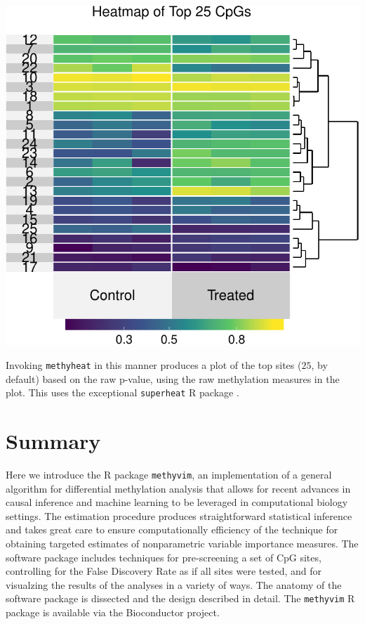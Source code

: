 \documentclass[9pt,a4paper,]{extarticle}
\theoremstyle{definition}
\theoremstyle{definition}
\theoremstyle{definition}
\theoremstyle{remark}
\begin{document}
\begin{center}\includegraphics{paper_BiocF1000_files/figure-latex/methyvim-heatmap-1} \end{center}

Invoking \texttt{methyheat} in this manner produces a plot of the top sites (\(25\), by
default) based on the raw p-value, using the raw methylation measures in the
plot. This uses the exceptional \texttt{superheat} R package \citep{barter2017superheat}.

\hypertarget{summary}{%
\section{Summary}\label{summary}}

Here we introduce the R package \texttt{methyvim}, an implementation of a general
algorithm for differential methylation analysis that allows for recent advances
in causal inference and machine learning to be leveraged in computational
biology settings. The estimation procedure produces straightforward statistical
inference and takes great care to ensure computationally efficiency of the
technique for obtaining targeted estimates of nonparametric variable importance
measures. The software package includes techniques for pre-screening a set of
CpG sites, controlling for the False Discovery Rate as if all sites were tested,
and for visualzing the results of the analyses in a variety of ways. The anatomy
of the software package is dissected and the design described in detail. The
\texttt{methyvim} R package is available via the Bioconductor project.
\end{document}
